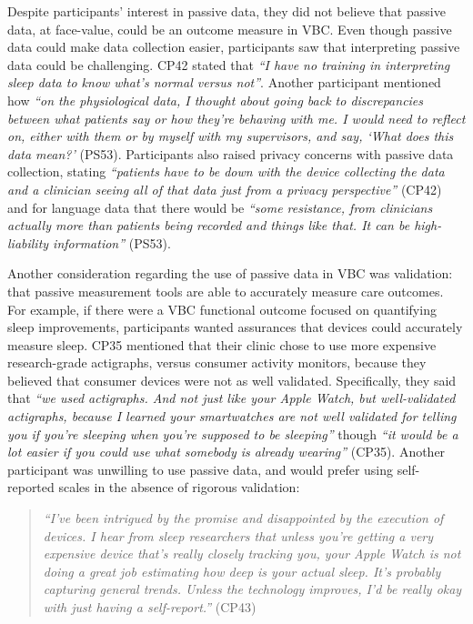 Despite participants' interest in passive data, they did not believe that passive data, at face-value, could be an outcome measure in VBC.
Even though passive data could make data collection easier, participants saw that interpreting passive data could be challenging.
CP42 stated that \textit{``I have no training in interpreting sleep data to know what's normal versus not''}.
Another participant mentioned how \textit{``on the physiological data, I thought about going back to discrepancies between what patients say or how they're behaving with me. I would need to reflect on, either with them or by myself with my supervisors, and say, `What does this data mean?'} (PS53).
Participants also raised privacy concerns with passive data collection, stating \textit{``patients have to be down with the device collecting the data and a clinician seeing all of that data just from a privacy perspective''} (CP42) and for language data that there would be \textit{``some resistance, from clinicians actually more than patients being recorded and things like that. It can be high-liability information''} (PS53).

Another consideration regarding the use of passive data in VBC was validation: that passive measurement tools are able to accurately measure care outcomes.
For example, if there were a VBC functional outcome focused on quantifying sleep improvements, participants wanted assurances that devices could accurately measure sleep.
CP35 mentioned that their clinic chose to use more expensive research-grade actigraphs, versus consumer activity monitors, because they believed that consumer devices were not as well validated.
Specifically, they said that \textit{``we used actigraphs. And not just like your Apple Watch, but well-validated actigraphs, because I learned your smartwatches are not well validated for telling you if you're sleeping when you're supposed to be sleeping''} though \textit{``it would be a lot easier if you could use what somebody is already wearing''} (CP35).
Another participant was unwilling to use passive data, and would prefer using self-reported scales in the absence of rigorous validation:

\begin{quote}
     \textit{``I've been intrigued by the promise and disappointed by the execution of devices. I hear from sleep researchers that unless you're getting a very expensive device that's really closely tracking you, your Apple Watch is not doing a great job estimating how deep is your actual sleep. 
     It's probably capturing general trends. 
     Unless the technology improves, I'd be really okay with just having a self-report.''} (CP43)
\end{quote}

